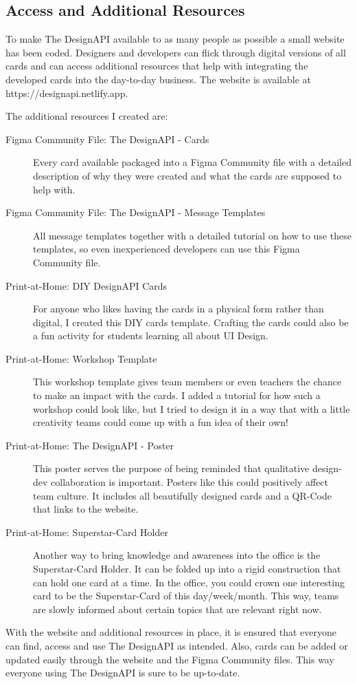 \newpage
\subsection{Access and Additional Resources}
To make The DesignAPI available to as many people as possible a small website has been coded.
Designers and developers can flick through digital versions of all cards and can access additional
resources that help with integrating the developed cards into the day-to-day business. The website
is available at https://designapi.netlify.app. 

The additional resources I created are:

\begin{description}
    \item[Figma Community File: The DesignAPI - Cards] Every card available packaged into a Figma
    Community file with a detailed description of why they were created and what the cards are
    supposed to help with.
    \item[Figma Community File: The DesignAPI - Message Templates] All message templates together
    with a detailed tutorial on how to use these templates, so even inexperienced developers can use
    this Figma Community file.
    \item[Print-at-Home: DIY DesignAPI Cards] For anyone who likes having the cards in a physical
    form rather than digital, I created this DIY cards template. Crafting the cards could also be a
    fun activity for students learning all about UI Design.
    \item[Print-at-Home: Workshop Template] This workshop template gives team members or even
    teachers the chance to make an impact with the cards. I added a tutorial for how such a workshop
    could look like, but I tried to design it in a way that with a little creativity teams could
    come up with a fun idea of their own!
    \item[Print-at-Home: The DesignAPI - Poster] This poster serves the purpose of being reminded
    that qualitative design-dev collaboration is important. Posters like this could positively
    affect team culture. It includes all beautifully designed cards and a QR-Code that links to the
    website. 
    \item[Print-at-Home: Superstar-Card Holder] Another way to bring knowledge and awareness into
    the office is the Superstar-Card Holder. It can be folded up into a rigid construction that can
    hold one card at a time. In the office, you could crown one interesting card to be the
    Superstar-Card of this day/week/month. This way, teams are slowly informed about certain topics
    that are relevant right now.
\end{description}

With the website and additional resources in place, it is ensured that everyone can find, access and
use The DesignAPI as intended. Also, cards can be added or updated easily through the website and
the Figma Community files. This way everyone using The DesignAPI is sure to be up-to-date.